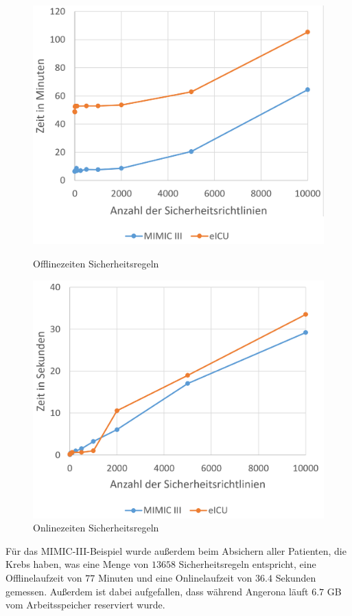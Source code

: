 \documentclass[german,version-2020-11]{uzl-thesis}
\begin{document}
	\begin{figure}[ht]
	\begin{minipage}{.5\textwidth}
		\centering
		\includegraphics[width=0.9\linewidth]{assets/OfflineEicuMimic.png}
		\caption{Offlinezeiten Sicherheitsregeln}
		\label{fig:offlinesecures}
	\end{minipage}
	\begin{minipage}{.5\textwidth}
		\centering
		\includegraphics[width=0.9\linewidth]{assets/onlineEicuMimic.png}
		\caption{Onlinezeiten Sicherheitsregeln}
		\label{fig:onlinesecures}
	\end{minipage}
\end{figure}
Für das MIMIC-III-Beispiel wurde außerdem beim Absichern aller Patienten, die Krebs haben, was eine Menge von $13658$ Sicherheitsregeln entspricht, eine Offlinelaufzeit von $77$ Minuten und eine Onlinelaufzeit von $36.4$ Sekunden gemessen. Außerdem ist dabei aufgefallen, dass während Angerona läuft $6.7$ GB vom Arbeitsspeicher reserviert wurde. \\ 
\end{document}
